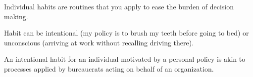 
Individual habits are routines that you apply to ease the burden of decision making. 

Habit can be intentional (my policy is to brush my teeth before going to bed) or unconscious (arriving at work without recalling driving there). 

An intentional habit for an individual motivated by a personal policy is akin to processes applied by bureaucrats acting on behalf of an organization.

